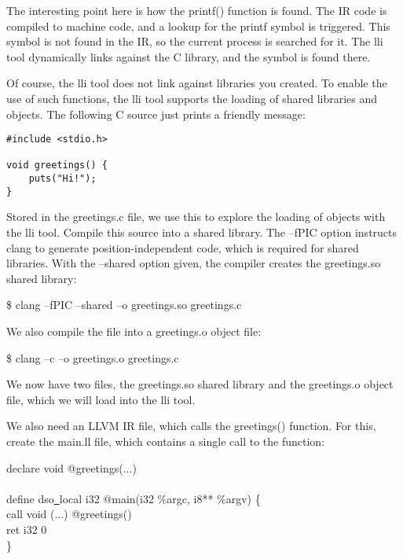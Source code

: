 The interesting point here is how the printf() function is found. The IR code is compiled to machine code, and a lookup for the printf symbol is triggered. This symbol is not found in the IR, so the current process is searched for it. The lli tool dynamically links against the C library, and the symbol is found there.\par

Of course, the lli tool does not link against libraries you created. To enable the use of such functions, the lli tool supports the loading of shared libraries and objects. The following C source just prints a friendly message:\par

\begin{lstlisting}[caption={}]
#include <stdio.h>

void greetings() {
	puts("Hi!");
}
\end{lstlisting}

Stored in the greetings.c file, we use this to explore the loading of objects with the lli tool. Compile this source into a shared library. The –fPIC option instructs clang to generate position-independent code, which is required for shared libraries. With the –shared option given, the compiler creates the greetings.so shared library:\par

\begin{tcolorbox}[colback=white,colframe=black]
\$ clang –fPIC –shared –o greetings.so greetings.c
\end{tcolorbox}

We also compile the file into a greetings.o object file:\par

\begin{tcolorbox}[colback=white,colframe=black]
\$ clang –c –o greetings.o greetings.c
\end{tcolorbox}

We now have two files, the greetings.so shared library and the greetings.o object file, which we will load into the lli tool.\par

We also need an LLVM IR file, which calls the greetings() function. For this, create the main.ll file, which contains a single call to the function:\par

\begin{tcolorbox}[colback=white,colframe=black]
declare void @greetings(...) \\
\\
define dso\underline{~}local i32 @main(i32 \%argc, i8** \%argv) \{ \\
\hspace*{0.5cm}call void (...) @greetings() \\
\hspace*{0.5cm}ret i32 0 \\
\}
\end{tcolorbox}


